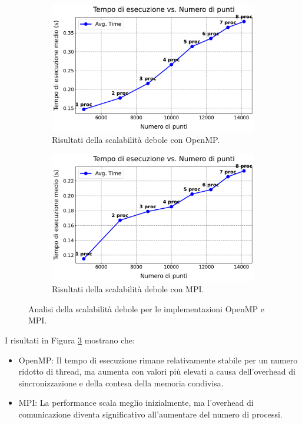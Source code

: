\documentclass[letterpaper,11pt,leqno]{article}
\begin{document}
\begin{figure}[h]
    \centering
    \begin{subfigure}{0.48\textwidth}
        \centering
        \includegraphics[scale=0.3]{graphs/omp_weak_scaling.pdf}
        \caption{Risultati della scalabilità debole con OpenMP.}
        \label{f:weak_scaling_omp}
    \end{subfigure}
    \hfill
    \begin{subfigure}{0.48\textwidth}
        \centering
        \includegraphics[scale=0.3]{graphs/mpi_weak_scaling.pdf}
        \caption{Risultati della scalabilità debole con MPI.}
        \label{f:weak_scaling_mpi}
    \end{subfigure}
    \caption{Analisi della scalabilità debole per le implementazioni OpenMP e MPI.}
    \label{f:weak_scaling_graphs}
\end{figure}

I risultati in Figura \ref{f:weak_scaling_graphs} mostrano che:
\begin{itemize}
    \item OpenMP: Il tempo di esecuzione rimane relativamente stabile per un numero ridotto di thread, ma aumenta con valori più elevati a causa dell'overhead di sincronizzazione e della contesa della memoria condivisa.
    \item MPI: La performance scala meglio inizialmente, ma l'overhead di comunicazione diventa significativo all'aumentare del numero di processi.
\end{itemize}
\end{document}
